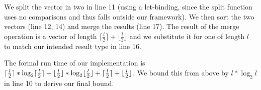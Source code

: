We split the vector in two in line 11 (using a let-binding, since the split function uses no comparisons and thus falls outside our framework). We then sort the two vectors (line 12, 14) and merge the results (line 17). The result of the merge operation is a vector of length $\lceil \frac l 2 \rceil + \lfloor \frac l 2 \rfloor$ and we substitute it for one of length $l$ to match our intended result type in line 16.

The formal run time of our implementation is $\lceil \frac{l}{2} \rceil * \log_2 \lceil \frac{l}{2} \rceil + \lfloor \frac{l}{2} \rfloor * \log_2 \lfloor \frac{l}{2} \rfloor + \lceil \frac{l}{2} \rceil + \lfloor \frac{l}{2} \rfloor$. We bound this from above by $l * \log_2 l$ in line 10 to derive our final bound.
